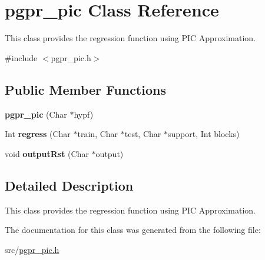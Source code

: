 \hypertarget{classpgpr__pic}{\section{pgpr\-\_\-pic Class Reference}
\label{classpgpr__pic}
}


This class provides the regression function using P\-I\-C Approximation.  




{\ttfamily \#include $<$pgpr\-\_\-pic.\-h$>$}

\subsection*{Public Member Functions}
\begin{DoxyCompactItemize}
\item 
\hypertarget{classpgpr__pic_ac79ec6dda8f0ecb0034ab3854243def6}{{\bfseries pgpr\-\_\-pic} (Char $\ast$hypf)}\label{classpgpr__pic_ac79ec6dda8f0ecb0034ab3854243def6}

\item 
\hypertarget{classpgpr__pic_a698e7cca6b9b7681972097bf7b6d8a6d}{Int {\bfseries regress} (Char $\ast$train, Char $\ast$test, Char $\ast$support, Int blocks)}\label{classpgpr__pic_a698e7cca6b9b7681972097bf7b6d8a6d}

\item 
\hypertarget{classpgpr__pic_a6908ad24c9b87f86c47242013976bddc}{void {\bfseries output\-Rst} (Char $\ast$output)}\label{classpgpr__pic_a6908ad24c9b87f86c47242013976bddc}

\end{DoxyCompactItemize}


\subsection{Detailed Description}
This class provides the regression function using P\-I\-C Approximation. 

The documentation for this class was generated from the following file\-:\begin{DoxyCompactItemize}
\item 
src/\hyperlink{pgpr__pic_8h}{pgpr\-\_\-pic.\-h}\end{DoxyCompactItemize}
